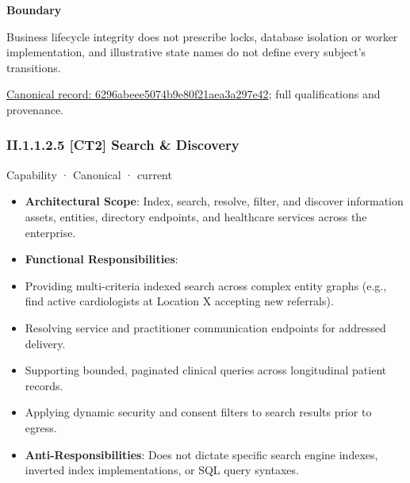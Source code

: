 \textbf{Boundary}



Business lifecycle integrity does not prescribe locks, database isolation or worker implementation, and illustrative state names do not define every subject's transitions.


{\footnotesize \href{../../../../continuum/strategy/capability/6296abeee5074b9e80f21aea3a297e42.md}{Canonical record: 6296abeee5074b9e80f21aea3a297e42}; full qualifications and provenance.}\par
\subsubsection*{II.1.1.2.5 [CT2] Search \& Discovery}
\label{navigation:II.1.1.2.5}

\label{element:6a45701634f04b43919d9152a61e5f2e}
{\small Capability · Canonical · current}\par

\begin{itemize}


\item \textbf{Architectural Scope}: Index, search, resolve, filter, and discover information assets, entities, directory endpoints, and healthcare services across the enterprise.

\item \textbf{Functional Responsibilities}:

\item Providing multi-criteria indexed search across complex entity graphs (e.g., find active cardiologists at Location X accepting new referrals).

\item Resolving service and practitioner communication endpoints for addressed delivery.

\item Supporting bounded, paginated clinical queries across longitudinal patient records.

\item Applying dynamic security and consent filters to search results prior to egress.

\item \textbf{Anti-Responsibilities}: Does not dictate specific search engine indexes, inverted index implementations, or SQL query syntaxes.

\end{itemize}


